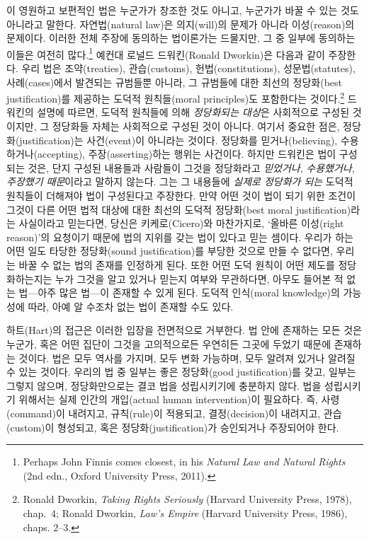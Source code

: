 \documentclass[12pt, oneside]{book}  %
\begin{document}
이 영원하고 보편적인 법은 누군가가 창조한 것도 아니고, 누군가가 바꿀 수
있는 것도 아니라고 말한다. 자연법(natural law)은 의지(will)의 문제가
아니라 이성(reason)의 문제이다. 이러한 전체 주장에 동의하는 법이론가는
드물지만, 그 중 일부에 동의하는 이들은 여전히 많다.\footnote{Perhaps
  John Finnis comes closest, in his \emph{Natural Law and Natural
  Rights} (2nd edn., Oxford University Press, 2011).} 예컨대 로널드
드워킨(Ronald Dworkin)은 다음과 같이 주장한다. 우리 법은 조약(treaties),
관습(customs), 헌법(constitutions), 성문법(statutes), 사례(cases)에서
발견되는 규범들뿐 아니라, 그 규범들에 대한 최선의 정당화(best
justification)를 제공하는 도덕적 원칙들(moral principles)도 포함한다는
것이다.\footnote{Ronald Dworkin, \emph{Taking Rights Seriously} (Harvard
  University Press, 1978), chap.~4; Ronald Dworkin, \emph{Law's Empire}
  (Harvard University Press, 1986), chaps. 2--3.} 드워킨의 설명에
따르면, 도덕적 원칙들에 의해 \emph{정당화되는 대상}은 사회적으로 구성된
것이지만, 그 정당화들 자체는 사회적으로 구성된 것이 아니다. 여기서
중요한 점은, 정당화(justification)는 사건(event)이 아니라는 것이다.
정당화를 믿거나(believing), 수용하거나(accepting), 주장(asserting)하는
행위는 사건이다. 하지만 드워킨은 법이 구성되는 것은, 단지 구성된
내용들과 사람들이 그것을 정당화라고 \emph{믿었거나}, \emph{수용했거나},
\emph{주장했기 때문}이라고 말하지 않는다. 그는 그 내용들에 \emph{실제로
정당화가 되는} 도덕적 원칙들이 더해져야 법이 구성된다고 주장한다. 만약
어떤 것이 법이 되기 위한 조건이 그것이 다른 어떤 법적 대상에 대한 최선의
도덕적 정당화(best moral justification)라는 사실이라고 믿는다면, 당신은
키케로(Cicero)와 마찬가지로, `올바른 이성(right reason)'의 요청이기
때문에 법의 지위를 갖는 법이 있다고 믿는 셈이다. 우리가 하는 어떤 일도
타당한 정당화(sound justification)를 부당한 것으로 만들 수 없다면,
우리는 바꿀 수 없는 법의 존재를 인정하게 된다. 또한 어떤 도덕 원칙이
어떤 제도를 정당화하는지는 누가 그것을 알고 있거나 믿는지 여부와
무관하다면, 아무도 들어본 적 없는 법---아주 많은 법---이 존재할 수 있게
된다. 도덕적 인식(moral knowledge)의 가능성에 따라, 아예 알 수조차 없는
법이 존재할 수도 있다.

하트(Hart)의 접근은 이러한 입장을 전면적으로 거부한다. 법 안에 존재하는
모든 것은 누군가, 혹은 어떤 집단이 그것을 고의적으로든 우연히든 그곳에
두었기 때문에 존재하는 것이다. 법은 모두 역사를 가지며, 모두 변화
가능하며, 모두 알려져 있거나 알려질 수 있는 것이다. 우리의 법 중 일부는
좋은 정당화(good justification)를 갖고, 일부는 그렇지 않으며,
정당화만으로는 결코 법을 성립시키기에 충분하지 않다. 법을 성립시키기
위해서는 실제 인간의 개입(actual human intervention)이 필요하다. 즉,
사령(command)이 내려지고, 규칙(rule)이 적용되고, 결정(decision)이
내려지고, 관습(custom)이 형성되고, 혹은 정당화(justification)가
승인되거나 주장되어야 한다.
\end{document}
